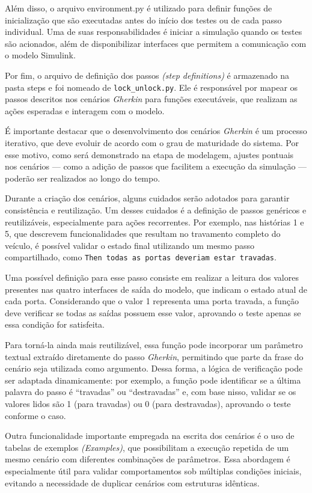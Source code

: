 Além disso, o arquivo environment.py é utilizado para definir funções de inicialização que são executadas antes do início dos testes ou de cada passo individual. 
Uma de suas responsabilidades é iniciar a simulação quando os testes são acionados, além de disponibilizar interfaces que permitem a comunicação com o modelo Simulink.

Por fim, o arquivo de definição dos passos \textit{(step definitions)} é armazenado na pasta steps e foi nomeado de \texttt{lock\_unlock.py}. Ele é responsável por mapear os 
passos descritos nos cenários \textit{Gherkin} para funções executáveis, que realizam as ações esperadas e interagem com o modelo.

É importante destacar que o desenvolvimento dos cenários \textit{Gherkin} é um processo iterativo, que deve evoluir de acordo com o grau de maturidade do sistema. 
Por esse motivo, como será demonstrado na etapa de modelagem, ajustes pontuais nos cenários — como a adição de passos que facilitem a execução da simulação — 
poderão ser realizados ao longo do tempo.

Durante a criação dos cenários, alguns cuidados serão adotados para garantir consistência e reutilização. Um desses cuidados é a definição de passos genéricos 
e reutilizáveis, especialmente para ações recorrentes. Por exemplo, nas histórias 1 e 5, que descrevem funcionalidades que resultam no travamento completo do 
veículo, é possível validar o estado final utilizando um mesmo passo compartilhado, como \texttt{Then todas as portas deveriam estar travadas}.

Uma possível definição para esse passo consiste em realizar a leitura dos valores presentes nas quatro interfaces de saída do modelo, que indicam o estado atual 
de cada porta. Considerando que o valor 1 representa uma porta travada, a função deve verificar se todas as saídas possuem esse valor, aprovando o teste apenas se 
essa condição for satisfeita.

Para torná-la ainda mais reutilizável, essa função pode incorporar um parâmetro textual extraído diretamente do passo \textit{Gherkin}, permitindo que parte da frase do 
cenário seja utilizada como argumento. Dessa forma, a lógica de verificação pode ser adaptada dinamicamente: por exemplo, a função pode identificar se a última 
palavra do passo é “travadas” ou “destravadas” e, com base nisso, validar se os valores lidos são 1 (para travadas) ou 0 (para destravadas), aprovando o teste 
conforme o caso.

Outra funcionalidade importante empregada na escrita dos cenários é o uso de tabelas de exemplos \textit{(Examples)}, que possibilitam a execução repetida de um mesmo 
cenário com diferentes combinações de parâmetros. Essa abordagem é especialmente útil para validar comportamentos sob múltiplas condições iniciais, evitando a 
necessidade de duplicar cenários com estruturas idênticas.

